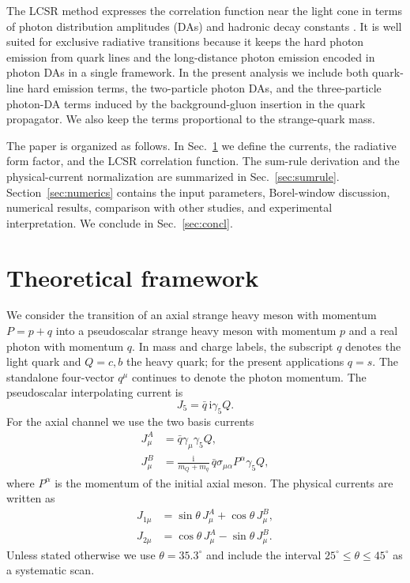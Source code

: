 \documentclass[aps,prd,preprint,nofootinbib,superscriptaddress]{revtex4-2}
\newcommand{\ii}{\mathrm{i}}
\begin{document}
The LCSR method expresses the correlation function near the light cone in
terms of photon distribution amplitudes (DAs) and hadronic decay constants
\cite{Shifman:1978bx,Braun:1997kw,Ball:2002ps,Colangelo:2005hv}.  It is well suited for
exclusive radiative transitions because it keeps the hard photon emission from
quark lines and the long-distance photon emission encoded in photon DAs in a
single framework.  In the present analysis we include both quark-line hard
emission terms, the two-particle photon DAs, and the three-particle photon-DA
terms induced by the background-gluon insertion in the quark propagator.  We
also keep the terms proportional to the strange-quark mass.

The paper is organized as follows.  In Sec.~\ref{sec:framework} we define the
currents, the radiative form factor, and the LCSR correlation function.  The
sum-rule derivation and the physical-current normalization are summarized in
Sec.~\ref{sec:sumrule}.  Section~\ref{sec:numerics} contains the input
parameters, Borel-window discussion, numerical results, comparison with other
studies, and experimental interpretation.  We conclude in Sec.~\ref{sec:concl}.

\section{Theoretical framework}
\label{sec:framework}

We consider the transition of an axial strange heavy meson with momentum
$P=p+q$ into a pseudoscalar strange heavy meson with momentum $p$ and a real
photon with momentum $q$.  In mass and charge labels, the subscript $q$ denotes
the light quark and \(Q=c,b\) the heavy quark; for the present applications
\(q=s\).  The standalone four-vector $q^\mu$ continues to denote the photon
momentum.  The pseudoscalar interpolating current is
\begin{equation}
  J_5=\bar q\,\ii\gamma_5 Q .
\end{equation}
For the axial channel we use the two basis currents
\begin{align}
  J^A_\mu &= \bar q\gamma_\mu\gamma_5 Q, \\
  J^B_\mu &= \frac{\ii}{m_Q+m_q}\,
  \bar q\sigma_{\mu\alpha}P^\alpha\gamma_5 Q ,
  \label{eq:basis-currents}
\end{align}
where $P^\alpha$ is the momentum of the initial axial meson.  The physical
currents are written as
\begin{align}
  J_{1\mu} &= \sin\theta\,J^A_\mu+\cos\theta\,J^B_\mu,\\
  J_{2\mu} &= \cos\theta\,J^A_\mu-\sin\theta\,J^B_\mu .
  \label{eq:physical-currents}
\end{align}
Unless stated otherwise we use $\theta=35.3^\circ$ and include the interval
$25^\circ\leq\theta\leq45^\circ$ as a systematic scan.
\end{document}
